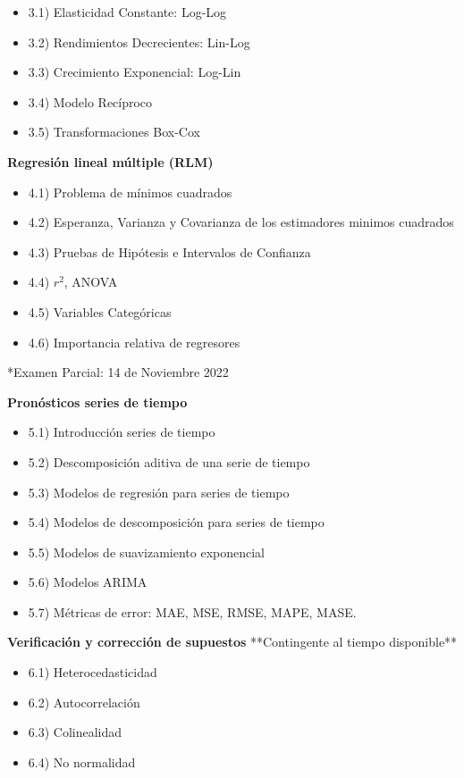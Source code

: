 \documentclass{../oxmathproblems}
\begin{document}
\begin{questions}
\begin{itemize}
\item 3.1) Elasticidad Constante: Log-Log
\item 3.2) Rendimientos Decrecientes: Lin-Log
\item 3.3) Crecimiento Exponencial: Log-Lin
\item 3.4) Modelo Recíproco
\item 3.5) Transformaciones Box-Cox
\end{itemize}

\miquestion \textbf{Regresión lineal múltiple (RLM)}
\begin{itemize}
\item 4.1) Problema de mínimos cuadrados
\item 4.2) Esperanza, Varianza y Covarianza de los estimadores minimos cuadrados
\item 4.3) Pruebas de Hipótesis e Intervalos de Confianza 
\item 4.4) $r^2$, ANOVA
\item 4.5) Variables Categóricas
\item 4.6) Importancia relativa de regresores
\end{itemize}
*Examen Parcial: 14 de Noviembre 2022

\miquestion \textbf{Pronósticos series de tiempo}

\begin{itemize}
\item 5.1) Introducción series de tiempo
\item 5.2) Descomposición aditiva de una serie de tiempo
\item 5.3) Modelos de regresión para series de tiempo
\item 5.4) Modelos de descomposición para series de tiempo
\item 5.5) Modelos de suavizamiento exponencial
\item 5.6) Modelos ARIMA
\item 5.7) Métricas de error: MAE, MSE, RMSE, MAPE, MASE.
\end{itemize}

\miquestion \textbf{Verificación y corrección de supuestos}
**Contingente al tiempo disponible**
\begin{itemize}
\item 6.1) Heterocedasticidad
\item 6.2) Autocorrelación
\item 6.3) Colinealidad
\item 6.4) No normalidad
\end{itemize}

\end{questions}
\end{document}
